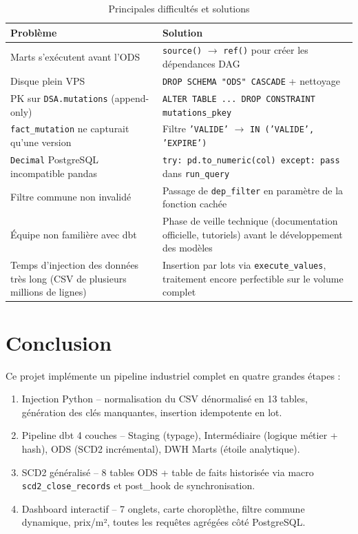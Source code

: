 \documentclass[12pt,a4paper]{article}
\let\oldsection\section
\renewcommand{\section}{\clearpage\oldsection}
\newcommand{\dbt}{dbt}
\newcommand{\sql}[1]{\texttt{\small #1}}
\begin{document}
\begin{table}[H]
  \centering
  \begin{tabularx}{\linewidth}{lX}
    \toprule
    \textbf{Problème} & \textbf{Solution} \\
    \midrule
    Marts s'exécutent avant l'ODS & \sql{source()} $\to$ \sql{ref()} pour créer les dépendances DAG \\
    Disque plein VPS & \texttt{DROP SCHEMA "ODS" CASCADE} + nettoyage \\
    PK sur \texttt{DSA.mutations} (append-only) & \texttt{ALTER TABLE ... DROP CONSTRAINT mutations\_pkey} \\
    \texttt{fact\_mutation} ne capturait qu'une version & Filtre \sql{'VALIDE'} $\to$ \sql{IN ('VALIDE', 'EXPIRE')} \\
    \texttt{Decimal} PostgreSQL incompatible pandas & \texttt{try: pd.to\_numeric(col) except: pass} dans \texttt{run\_query} \\
    Filtre commune non invalidé & Passage de \texttt{dep\_filter} en paramètre de la fonction cachée \\
    Équipe non familière avec \dbt{} & Phase de veille technique (documentation officielle, tutoriels) avant le développement des modèles \\
    Temps d'injection des données très long (CSV de plusieurs millions de lignes) & Insertion par lots via \texttt{execute\_values}, traitement encore perfectible sur le volume complet \\
    \bottomrule
  \end{tabularx}
  \caption{Principales difficultés et solutions}
\end{table}

\section{Conclusion}

Ce projet implémente un pipeline industriel complet en quatre grandes étapes :

\begin{enumerate}[noitemsep]
  \item Injection Python -- normalisation du CSV dénormalisé en 13 tables,
        génération des clés manquantes, insertion idempotente en lot.
  \item Pipeline dbt 4 couches -- Staging (typage), Intermédiaire (logique
        métier + hash), ODS (SCD2 incrémental), DWH Marts (étoile analytique).
  \item SCD2 généralisé -- 8 tables ODS + table de faits historisée via
        macro \texttt{scd2\_close\_records} et post\_hook de synchronisation.
  \item Dashboard interactif -- 7 onglets, carte choroplèthe, filtre
        commune dynamique, prix/m², toutes les requêtes agrégées côté PostgreSQL.
\end{enumerate}
\end{document}

